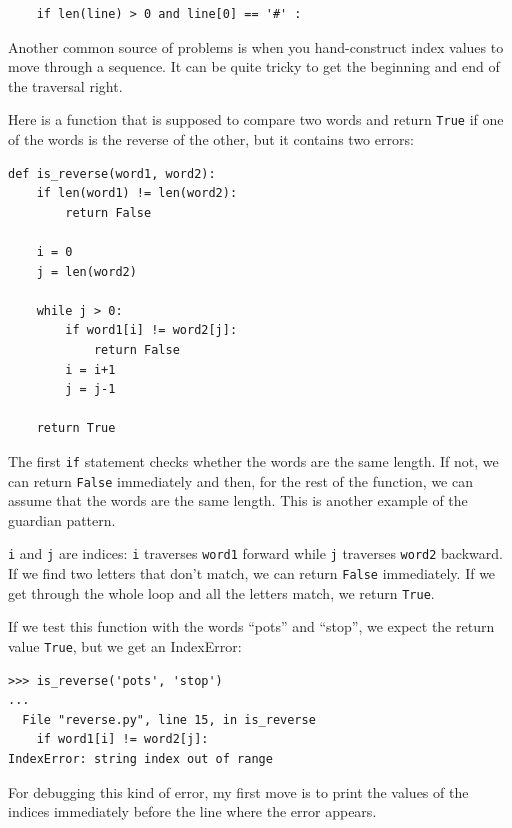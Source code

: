 \documentclass[10pt]{book}
\begin{document}
\beforeverb
\begin{verbatim}
    if len(line) > 0 and line[0] == '#' :
\end{verbatim}
\afterverb
%


Another common source of problems is when you hand-construct 
index values to move through a sequence.
It can be quite tricky to get the beginning and 
end of the traversal right. 

Here is a function that is supposed to compare two
words and return {\tt True} if one of the words is the reverse
of the other, but it contains two errors:

\beforeverb
\begin{verbatim}
def is_reverse(word1, word2):
    if len(word1) != len(word2):
        return False
    
    i = 0
    j = len(word2)

    while j > 0:
        if word1[i] != word2[j]:
            return False
        i = i+1
        j = j-1

    return True
\end{verbatim}
\afterverb
%
The first {\tt if} statement checks whether the words are the
same length.  If not, we can return {\tt False} immediately
and then, for the rest of the function, we can assume that the words
are the same length.  This is another example of the guardian pattern.


{\tt i} and {\tt j} are indices: {\tt i} traverses {\tt word1}
forward while {\tt j} traverses {\tt word2} backward.  If we find
two letters that don't match, we can return {\tt False} immediately.
If we get through the whole loop and all the letters match, we
return {\tt True}.

If we test this function with the words ``pots'' and ``stop'', we
expect the return value {\tt True}, but we get an IndexError:


\beforeverb
\begin{verbatim}
>>> is_reverse('pots', 'stop')
...
  File "reverse.py", line 15, in is_reverse
    if word1[i] != word2[j]:
IndexError: string index out of range
\end{verbatim}
\afterverb
%
For debugging this kind of error, my first move is to
print the values of the indices immediately before the line
where the error appears.
\end{document}

